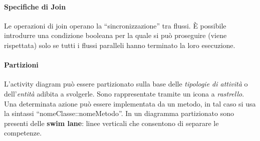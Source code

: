 \begin{figure}[H]
    \hfill
\end{figure}

\paragraph{Specifiche di Join} Le operazioni di join operano la “sincronizzazione” tra flussi. È possibile introdurre una condizione booleana per la quale si può proseguire (viene rispettata) solo se tutti i flussi paralleli hanno terminato la loro esecuzione.

\paragraph{Partizioni} L'activity diagram può essere partizionato sulla base delle \textit{tipologie di attività} o dell'\textit{entità} adibita a svolgerle. Sono rappresentate tramite un icona a \textit{rastrello}. Una determinata azione può essere implementata da un metodo, in tal caso si usa la sintassi “nomeClasse::nomeMetodo”. In un diagramma partizionato sono presenti delle \textbf{swim lane}: linee verticali che consentono di separare le competenze.

